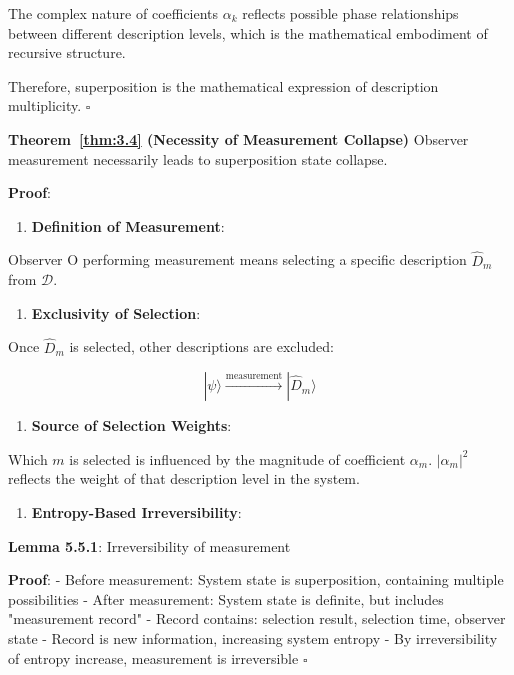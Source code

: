    The complex nature of coefficients $\alpha_k$ reflects possible phase relationships between different description levels, which is the mathematical embodiment of recursive structure.

Therefore, superposition is the mathematical expression of description multiplicity. $\square$

\textbf{Theorem~\ref{thm:3.4} (Necessity of Measurement Collapse)}
\label{thm:3.4}
Observer measurement necessarily leads to superposition state collapse.

\textbf{Proof}:

\begin{enumerate}
\item \textbf{Definition of Measurement}:
\end{enumerate}
   Observer O performing measurement means selecting a specific description $\hat{D}_m$ from $\mathcal{D}$.
   
\begin{enumerate}
\item \textbf{Exclusivity of Selection}:
\end{enumerate}
   Once $\hat{D}_m$ is selected, other descriptions are excluded:
   
\begin{equation}
|\psi\rangle \xrightarrow{\text{measurement}} |\hat{D}_m\rangle
\end{equation}

\begin{enumerate}
\item \textbf{Source of Selection Weights}:
\end{enumerate}
   Which $m$ is selected is influenced by the magnitude of coefficient $\alpha_m$.
   $|\alpha_m|^2$ reflects the weight of that description level in the system.
   
\begin{enumerate}
\item \textbf{Entropy-Based Irreversibility}:
\end{enumerate}
   \textbf{Lemma 5.5.1}: Irreversibility of measurement
\label{thm:3.4}
   
   \textbf{Proof}:
   - Before measurement: System state is superposition, containing multiple possibilities
   - After measurement: System state is definite, but includes "measurement record"
   - Record contains: selection result, selection time, observer state
   - Record is new information, increasing system entropy
   - By irreversibility of entropy increase, measurement is irreversible $\square$


